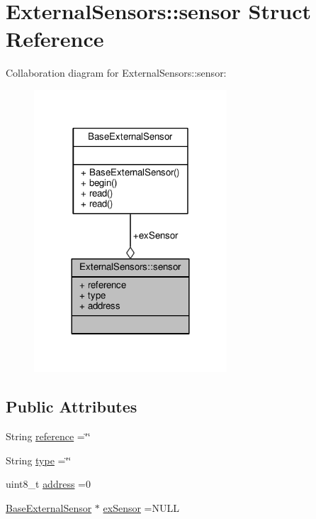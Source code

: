 \hypertarget{struct_external_sensors_1_1sensor}{}\section{External\+Sensors\+:\+:sensor Struct Reference}
\label{struct_external_sensors_1_1sensor}


Collaboration diagram for External\+Sensors\+:\+:sensor\+:
\nopagebreak
\begin{figure}[H]
\begin{center}
\leavevmode
\includegraphics[width=204pt]{struct_external_sensors_1_1sensor__coll__graph}
\end{center}
\end{figure}
\subsection*{Public Attributes}
\begin{DoxyCompactItemize}
\item 
String \hyperlink{struct_external_sensors_1_1sensor_afed5bdfd49732202a368b600cb8396fe}{reference} =\char`\"{}\char`\"{}
\item 
String \hyperlink{struct_external_sensors_1_1sensor_a6acfdb02c742c2110d7bd2b5d9fce9e7}{type} =\char`\"{}\char`\"{}
\item 
uint8\+\_\+t \hyperlink{struct_external_sensors_1_1sensor_a8d70ca58524521ed054fc6b81eb58d34}{address} =0
\item 
\hyperlink{class_base_external_sensor}{Base\+External\+Sensor} $\ast$ \hyperlink{struct_external_sensors_1_1sensor_a9bca150fd468b8d0e090e6d72c5c2b48}{ex\+Sensor} =N\+U\+LL
\end{DoxyCompactItemize}


